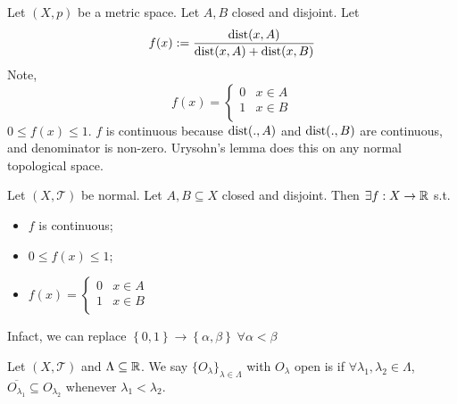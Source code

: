 \begin{goal}[motivation]
    Let $(X, p)$ be a metric space. Let $A, B$ closed and disjoint. Let 
    \[
        f(x) := \frac{\operatorname{dist}(x, A)}{\operatorname{dist}(x, A) + \operatorname{dist}(x, B)}
    \]   
    Note,
    \[
        f(x) = \begin{cases}
            0 &x \in A \\
            1 &x \in B \\
        \end{cases}
    \] 
    $0 \leq f(x) \leq 1$. $f$ is continuous because $\operatorname{dist}(., A)$ and $\operatorname{dist}(., B)$ are
    continuous, and denominator is non-zero. Urysohn's lemma does this on any normal topological space.   
\end{goal}

\begin{lem}
    Let $(X, \mathcal{T})$ be normal. Let $A, B \subseteq X$ closed and disjoint. Then $
    \exists f : X \to \mathbb{R}$ s.t. 
    \begin{itemize}
        \item $f$ is continuous;
        \item $0 \leq f(x) \leq 1$;
        \item $f(x) =   \begin{cases}
                            0 & x \in A \\
                            1 & x \in B \\
                        \end{cases} $
    \end{itemize}  
\end{lem}

\begin{rem}
    Infact, we can replace $\left\{ 0, 1 \right\} \to \left\{ \alpha, \beta \right\} \; 
    \forall \alpha < \beta$ 
\end{rem}

\begin{defn}
    Let $(X, \mathcal{T})$ and $\Lambda \subseteq \mathbb{R}$. We say $\{O_{\lambda}\}_{\lambda \in \Lambda}$
    with $O_\lambda$ open is  if $\forall \lambda_1, \lambda_2 \in \Lambda$,
    $\overline{O_{\lambda_1}} \subseteq O_{\lambda_2}$ whenever $\lambda_1 < \lambda_2$.      
\end{defn}

